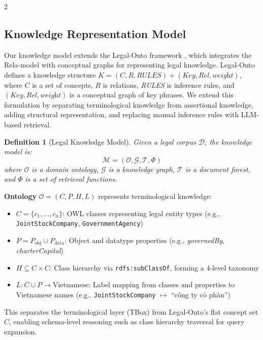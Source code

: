 \documentclass[11pt,a4paper]{article}
\newtheorem{definition}{Definition}
\begin{document}
\begin{multicols}{2}

\subsection{Knowledge Representation Model}

Our knowledge model extends the Legal-Onto framework \cite{ref6}, which integrates the Rela-model \cite{ref10} with conceptual graphs for representing legal knowledge. Legal-Onto defines a knowledge structure $K = (C, R, \textit{RULES}) + (\textit{Key}, \textit{Rel}, \textit{weight})$, where $C$ is a set of concepts, $R$ is relations, \textit{RULES} is inference rules, and $(\textit{Key}, \textit{Rel}, \textit{weight})$ is a conceptual graph of key phrases. We extend this formulation by separating terminological knowledge from assertional knowledge, adding structural representation, and replacing manual inference rules with LLM-based retrieval.

\begin{definition}[Legal Knowledge Model]
Given a legal corpus $\mathcal{D}$, the knowledge model is:
\begin{equation}
\mathcal{M} = (\mathcal{O}, \mathcal{G}, \mathcal{T}, \Phi)
\end{equation}
where $\mathcal{O}$ is a domain ontology, $\mathcal{G}$ is a knowledge graph, $\mathcal{T}$ is a document forest, and $\Phi$ is a set of retrieval functions.
\end{definition}

\textbf{Ontology} $\mathcal{O} = (C, P, H, L)$ represents terminological knowledge:
\begin{itemize}
\item $C = \{c_1, \ldots, c_n\}$: OWL classes representing legal entity types (e.g., \texttt{JointStockCompany}, \texttt{GovernmentAgency})
\item $P = P_\text{obj} \cup P_\text{data}$: Object and datatype properties (e.g., \textit{governedBy}, \textit{charterCapital})
\item $H \subseteq C \times C$: Class hierarchy via \texttt{rdfs:subClassOf}, forming a 4-level taxonomy
\item $L: C \cup P \to \text{Vietnamese}$: Label mapping from classes and properties to Vietnamese names (e.g., \texttt{JointStockCompany} $\mapsto$ ``c\^ong ty c\h{o} ph\`an'')
\end{itemize}

This separates the terminological layer (TBox) from Legal-Onto's flat concept set $C$, enabling schema-level reasoning such as class hierarchy traversal for query expansion.


\end{multicols}
\end{document}
